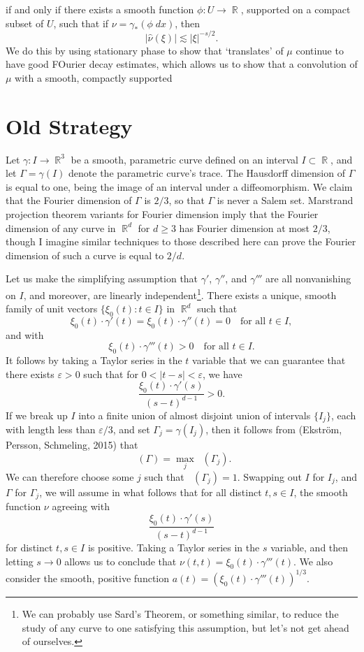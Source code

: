 \documentclass[dvipsnames,letterpaper,12pt]{article}
\DeclareMathOperator{\fordim}{\dim_{\mathbb{F}}}
\DeclareMathOperator{\RR}{\mathbb{R}}
\begin{document}
if and only if there exists a smooth function $\phi:U \to \RR$, supported on a compact subset of $U$, such that if $\nu = \gamma_*( \phi\; dx)$, then
%
\[ |\widehat{\nu}(\xi)| \lesssim |\xi|^{-s/2}. \]
%
We do this by using stationary phase to show that `translates' of $\mu$ continue to have good FOurier decay estimates, which allows us to show that a convolution of $\mu$ with a smooth, compactly supported

\section{Old Strategy}

Let $\gamma: I \to \RR^3$ be a smooth, parametric curve defined on an interval $I \subset \RR$, and let $\Gamma = \gamma(I)$ denote the parametric curve's trace. The Hausdorff dimension of $\Gamma$ is equal to one, being the image of an interval under a diffeomorphism. We claim that the Fourier dimension of $\Gamma$ is $2/3$, so that $\Gamma$ is never a Salem set. Marstrand projection theorem variants for Fourier dimension imply that the Fourier dimension of any curve in $\RR^d$ for $d \geq 3$ has Fourier dimension at most $2/3$, though I imagine similar techniques to those described here can prove the Fourier dimension of such a curve is equal to $2/d$.

Let us make the simplifying assumption that $\gamma'$, $\gamma''$, and $\gamma'''$ are all nonvanishing on $I$, and moreover, are linearly independent\footnote{We can probably use Sard's Theorem, or something similar, to reduce the study of any curve to one satisfying this assumption, but let's not get ahead of ourselves.}. There exists a unique, smooth family of unit vectors $\{ \xi_0(t) : t \in I \}$ in $\RR^d$ such that
%
\[ \xi_0(t) \cdot \gamma'(t) = \xi_0(t) \cdot \gamma''(t) = 0 \quad\text{for all $t \in I$}, \]
%
and with
%
\[ \xi_0(t) \cdot \gamma'''(t) > 0 \quad \text{for all $t \in I$}. \]
%
It follows by taking a Taylor series in the $t$ variable that we can guarantee that there exists $\varepsilon > 0$ such that for $0 < |t - s| < \varepsilon$, we have
%
\[ \frac{\xi_0(t) \cdot \gamma'(s)}{(s - t)^{d-1}} > 0. \]
%
If we break up $I$ into a finite union of almost disjoint union of intervals $\{ I_j \}$, each with length less than $\varepsilon / 3$, and set $\Gamma_j = \gamma(I_j)$, then it follows from (Ekstr\"{o}m, Persson, Schmeling, 2015) that
%
\[ \fordim(\Gamma) = \max_j \fordim(\Gamma_j). \]
%
We can therefore choose some $j$ such that $\fordim(\Gamma_j) = 1$. Swapping out $I$ for $I_j$, and $\Gamma$ for $\Gamma_j$, we will assume in what follows that for all distinct $t,s \in I$, the smooth function $\nu$ agreeing with
%
\[ \frac{\xi_0(t) \cdot \gamma'(s)}{(s - t)^{d-1}} \]
%
for distinct $t,s \in I$ is positive. Taking a Taylor series in the $s$ variable, and then letting $s \to 0$ allows us to conclude that $\nu(t,t) = \xi_0(t) \cdot \gamma'''(t)$. We also consider the smooth, positive function $a(t) = (\xi_0(t) \cdot \gamma'''(t))^{1/3}$.
\end{document}
